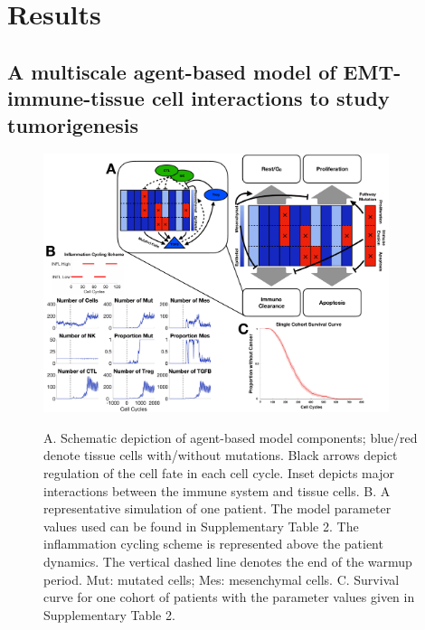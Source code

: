 \documentclass[11pt]{article}
\newcommand{\tcr} { \textcolor{red} }
\begin{document}
\section{Results}

\subsection{A multiscale agent-based model of EMT-immune-tissue cell interactions to study tumorigenesis}\label{ExplModel}

\begin{figure}
\center
{\includegraphics[width=0.9\textwidth]{Figure1/Figure1.pdf}}
\caption{A. Schematic depiction of agent-based model components; blue/red denote tissue cells with/without mutations. Black arrows depict regulation of the cell fate in each cell cycle. Inset depicts major interactions between the immune system and tissue cells.
B. A representative simulation of one patient. The model parameter values used can be found in Supplementary Table 2. 
The inflammation cycling scheme is represented above the patient dynamics. The vertical dashed line denotes the end of the warmup period. Mut: mutated cells; Mes: mesenchymal cells. 
C. Survival curve for one cohort of patients with the parameter values given in Supplementary Table 2. }
\label{fig:ModelIntro}
\end{figure}
\end{document}
